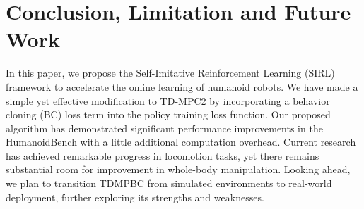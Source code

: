 \section{Conclusion, Limitation and Future Work}
In this paper, we propose the Self-Imitative Reinforcement Learning (SIRL) framework to accelerate the online learning of humanoid robots.
We have made a simple yet effective modification to TD-MPC2 by incorporating a behavior cloning (BC) loss term into the policy training loss function. 
Our proposed algorithm has demonstrated significant performance improvements in the HumanoidBench with a little additional computation overhead. 
Current research has achieved remarkable progress in locomotion tasks, yet there remains substantial room for improvement in whole-body manipulation. 
Looking ahead, we plan to transition TDMPBC from simulated environments to real-world deployment, further exploring its strengths and weaknesses.